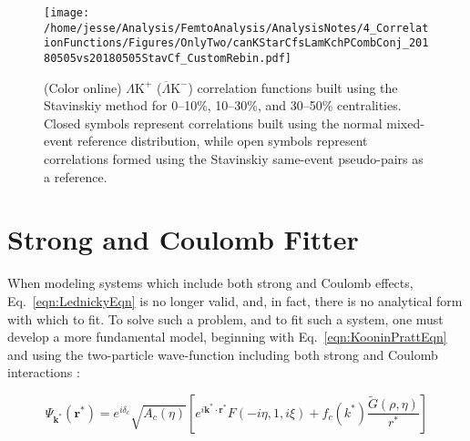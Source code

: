 \documentclass[ALICE,manyauthors]{cernphprep}
\newcommand{\LamKchP}{$\Lambda\mathrm{K^{+}}$\xspace}
\newcommand{\LamKchPALamKchM}{$\Lambda\mathrm{K^{+}}$ ($\overline{\Lambda}\mathrm{K^{-}}$)\xspace}
\begin{document}
\begin{figure}[h!]
  \centering
  \texttt{[image: /home/jesse/Analysis/FemtoAnalysis/AnalysisNotes/4\_CorrelationFunctions/Figures/OnlyTwo/canKStarCfsLamKchPCombConj\_20180505vs20180505StavCf\_CustomRebin.pdf]}
  \caption[\LamKchP Stavinskiy Correlation Functions]
  {
  (Color online) \LamKchPALamKchM correlation functions built using the Stavinskiy method for 0--10\%, 10--30\%, and 30--50\% centralities.  Closed symbols represent correlations built using the normal mixed-event reference distribution, while open symbols represent correlations formed using the Stavinskiy same-event pseudo-pairs as a reference.
  }
  \label{fig:StavCfs_Correct_LamKchP}
\end{figure} 



\section{Strong and Coulomb Fitter}
\label{App:CoulombFitter}

When modeling systems which include both strong and Coulomb effects, Eq.\ \ref{eqn:LednickyEqn} is no longer valid, and, in fact, there is no analytical form with which to fit.
To solve such a problem, and to fit such a system, one must develop a more fundamental model, beginning with Eq.\ \ref{eqn:KooninPrattEqn} and using the two-particle wave-function including both strong and Coulomb interactions \cite{Lednicky:2005tb}:

\begin{equation}
 \Psi_{\mathbf{k^{*}}}(\mathbf{r^{*}}) = e^{i\delta_{c}}\sqrt{A_{c}(\eta)}[e^{i\mathbf{k^{*}} \cdot \mathbf{r^{*}}}F(-i\eta,1,i\xi) + f_{c}(k^{*})\frac{\tilde{G}(\rho,\eta)}{r^{*}}]
\label{eqn:CoulombWaveFcn}
\end{equation}
\end{document}
